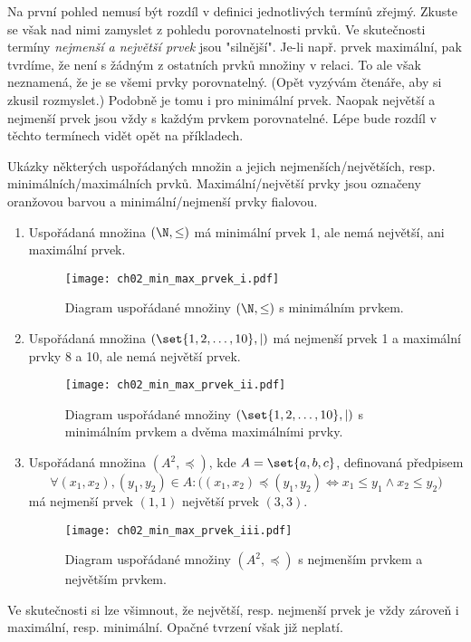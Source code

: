 Na první pohled nemusí být rozdíl v definici jednotlivých termínů zřejmý. Zkuste se však nad nimi zamyslet z pohledu porovnatelnosti prvků. Ve skutečnosti termíny \emph{nejmenší a největší prvek} jsou "silnější". Je-li např. prvek maximální, pak tvrdíme, že není s žádným z ostatních prvků množiny v relaci. To ale však neznamená, že je se všemi prvky porovnatelný. (Opět vyzývám čtenáře, aby si zkusil rozmyslet.) Podobně je tomu i pro minimální prvek. Naopak největší a nejmenší prvek jsou vždy s každým prvkem porovnatelné. Lépe bude rozdíl v těchto termínech vidět opět na příkladech.
\begin{example}\label{ex:min_max_prvek}
    \sloppy Ukázky některých uspořádaných množin a jejich nejmenších/největších, resp. minimálních/maximálních prvků. Maximální/největší prvky jsou označeny oranžovou barvou a minimální/nejmenší prvky fialovou. 
    \begin{enumerate}[label=(\roman*)]
        \item\label{item:min_max_prvek_i} Uspořádaná množina $(\N,\leq)$ má minimální prvek 1, ale nemá největší, ani maximální prvek.
        \begin{figure}[h]
            \centering
            \texttt{[image: ch02\_min\_max\_prvek\_i.pdf]}
            \caption{Diagram uspořádané množiny $(\N,\leq)$ s minimálním prvkem.}
            \label{fig:min_max_prvek_i}
        \end{figure}
        \item\label{item:min_max_prvek_ii} Uspořádaná množina $(\set{1,2,\dots,10},\mid)$ má nejmenší prvek 1 a maximální prvky 8 a 10, ale nemá největší prvek.
        \begin{figure}[h]
            \centering
            \texttt{[image: ch02\_min\_max\_prvek\_ii.pdf]}
            \caption{Diagram uspořádané množiny $(\set{1,2,\dots,10},\mid)$ s minimálním prvkem a dvěma maximálními prvky.}
            \label{fig:min_max_prvek_ii}
        \end{figure}
        \item\label{item:min_max_prvek_iii} Uspořádaná množina $(A^2,\preceq)$, kde $A=\set{a,b,c}$, definovaná předpisem
        \begin{equation*}
            \forall (x_1,x_2),(y_1,y_2)\in A: \big((x_1,x_2)\preceq (y_1,y_2) \iff x_1\leq y_1 \land x_2\leq y_2\big)
        \end{equation*}
        má nejmenší prvek $(1,1)$ největší prvek $(3,3)$.
        \begin{figure}[h]
            \centering
            \texttt{[image: ch02\_min\_max\_prvek\_iii.pdf]}
            \caption{Diagram uspořádané množiny $(A^2,\preceq)$ s nejmenším prvkem a největším prvkem.}
            \label{fig:min_max_prvek_iii}
        \end{figure}
    \end{enumerate}
\end{example}
Ve skutečnosti si lze všimnout, že největší, resp. nejmenší prvek je vždy zároveň i maximální, resp. minimální. Opačné tvrzení však již neplatí.